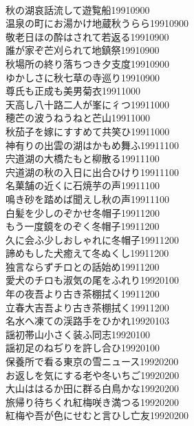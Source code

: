 \begin{multicols}{2}
\\秋の湖哀話流して遊覧船\hfill{19910900}
\\温泉の町にお湯かけ地蔵秋うらら\hfill{19910900}
\\敬老日ほの酔はされて若返る\hfill{19910900}
\\誰が家ぞ芒刈られて地鎮祭\hfill{19910900}
\\秋場所の終り落ちつき夕支度\hfill{19910900}
\\ゆかしさに秋七草の寺巡り\hfill{19910900}
\\尊氏も正成も美男菊衣\hfill{19911000}
\\天高し八十路二人が峯に彳つ\hfill{19911000}
\\穂芒の波うねうねと芒山\hfill{19911000}
\\秋茄子を嫁にすすめて共笑ひ\hfill{19911000}
\\神有りの出雲の湖はかもめ舞ふ\hfill{19911100}
\\宍道湖の大橋たもと柳散る\hfill{19911100}
\\宍道湖の秋の入日に出合ひけり\hfill{19911100}
\\名菓舗の近くに石焼芋の声\hfill{19911100}
\\鳴き砂を踏めば聞えし秋の声\hfill{19911100}
\\白髪を少しのぞかせ冬帽子\hfill{19911200}
\\もう一度鏡をのぞく冬帽子\hfill{19911200}
\\久に会ふ少しおしゃれに冬帽子\hfill{19911200}
\\諦めもした犬癒えて冬ぬくし\hfill{19911200}
\\独言ならずチロとの話始め\hfill{19911200}
\\愛犬のチロも淑気の尾をふれり\hfill{19920100}
\\年の夜吾より古き茶棚拭く\hfill{19911200}
\\立春大吉吾より古き茶棚拭く\hfill{19911200}
\\名水へ凍ての渓路手をひかれ\hfill{19920103}
\\謡初帯山小さく装ふ同志\hfill{19920100}
\\謡初足のねぢりを許し合ひ\hfill{19920100}
\\保養所で看る東京の雪ニュース\hfill{19920200}
\\お返しを気にする老や冬いちご\hfill{19920200}
\\大山ははるか田に群る白鳥かな\hfill{19920200}
\\旅帰り待ちくれ紅梅咲き満つる\hfill{19920200}
\\紅梅や吾が色にせむと言ひし亡友\hfill{19920200}

\end{multicols}
